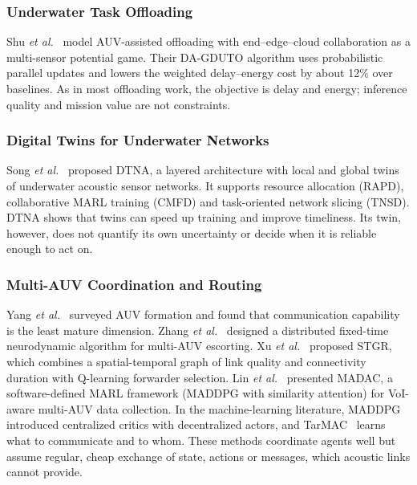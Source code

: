 \documentclass[lettersize,journal]{IEEEtran}
\begin{document}
\subsubsection{Underwater Task Offloading}
Shu \emph{et al.}~\cite{shu2026offload} model AUV-assisted offloading with end--edge--cloud collaboration as a multi-sensor potential game. Their DA-GDUTO algorithm uses probabilistic parallel updates and lowers the weighted delay--energy cost by about 12\% over baselines. As in most offloading work, the objective is delay and energy; inference quality and mission value are not constraints.

\subsubsection{Digital Twins for Underwater Networks}
Song \emph{et al.}~\cite{song2025dtna} proposed DTNA, a layered architecture with local and global twins of underwater acoustic sensor networks. It supports resource allocation (RAPD), collaborative MARL training (CMFD) and task-oriented network slicing (TNSD). DTNA shows that twins can speed up training and improve timeliness. Its twin, however, does not quantify its own uncertainty or decide when it is reliable enough to act on.

\subsubsection{Multi-AUV Coordination and Routing}
Yang \emph{et al.}~\cite{yang2021survey} surveyed AUV formation and found that communication capability is the least mature dimension. Zhang \emph{et al.}~\cite{zhang2025dfxtna} designed a distributed fixed-time neurodynamic algorithm for multi-AUV escorting. Xu \emph{et al.}~\cite{xu2025stgr} proposed STGR, which combines a spatial-temporal graph of link quality and connectivity duration with Q-learning forwarder selection. Lin \emph{et al.}~\cite{lin2025madac} presented MADAC, a software-defined MARL framework (MADDPG with similarity attention) for VoI-aware multi-AUV data collection. In the machine-learning literature, MADDPG~\cite{lowe2017maddpg} introduced centralized critics with decentralized actors, and TarMAC~\cite{das2019tarmac} learns what to communicate and to whom. These methods coordinate agents well but assume regular, cheap exchange of state, actions or messages, which acoustic links cannot provide.
\end{document}
